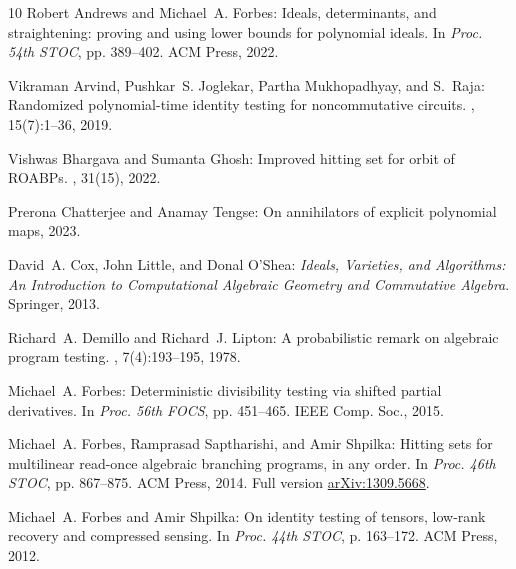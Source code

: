 \begin{thebibliography}{10}
{\sc Robert Andrews and Michael~A. Forbes}: Ideals, determinants, and
  straightening: proving and using lower bounds for polynomial ideals.
\newblock In {\em Proc. 54th STOC}, pp. 389--402. ACM Press, 2022.
\newblock [\epfmtdoi{10.1145/3519935.3520025}]

{\sc Vikraman Arvind, Pushkar~S. Joglekar, Partha Mukhopadhyay, and S.~Raja}:
  Randomized polynomial-time identity testing for noncommutative circuits.
, 15(7):1--36, 2019.

{\sc Vishwas Bhargava and Sumanta Ghosh}: Improved hitting set for orbit of
  {ROABPs}.
, 31(15), 2022.
\newblock [\epfmtdoi{10.1007/s00037-022-00230-9}]

{\sc Prerona Chatterjee and Anamay Tengse}: On annihilators of explicit
  polynomial maps, 2023.

{\sc David~A. Cox, John Little, and Donal O'Shea}: {\em Ideals, Varieties, and
  Algorithms: An Introduction to Computational Algebraic Geometry and
  Commutative Algebra}.
\newblock Springer, 2013.
\newblock [\epfmtdoi{10.1007/978-3-319-16721-3}]

{\sc Richard~A. Demillo and Richard~J. Lipton}: A probabilistic remark on
  algebraic program testing.
, 7(4):193--195, 1978.
\newblock [\epfmtdoi{10.1016/0020-0190(78)90067-4}]

{\sc Michael~A. Forbes}: Deterministic divisibility testing via shifted partial
  derivatives.
\newblock In {\em Proc. 56th FOCS}, pp. 451--465. IEEE Comp. Soc., 2015.

{\sc Michael~A. Forbes, Ramprasad Saptharishi, and Amir Shpilka}: Hitting sets
  for multilinear read-once algebraic branching programs, in any order.
\newblock In {\em Proc. 46th STOC}, pp. 867--875. ACM Press, 2014.
\newblock Full version \href{https://arxiv.org/abs/1309.5668}{arXiv:1309.5668}.
\newblock [\epfmtdoi{10.1145/2591796.2591816}]

{\sc Michael~A. Forbes and Amir Shpilka}: On identity testing of tensors,
  low-rank recovery and compressed sensing.
\newblock In {\em Proc. 44th STOC}, p. 163–172. ACM Press, 2012.
\newblock [\epfmtdoi{10.1145/2213977.2213995}]


\end{thebibliography}
